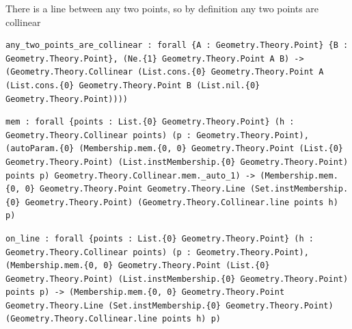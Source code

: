 \begin{theorem}
  \label{Geometry.Theory.Collinear.any_two_points_are_collinear}
  \leanok
  There is a line between any two points, so by definition any two points are collinear 
\begin{verbatim}any_two_points_are_collinear : forall {A : Geometry.Theory.Point} {B : Geometry.Theory.Point}, (Ne.{1} Geometry.Theory.Point A B) -> (Geometry.Theory.Collinear (List.cons.{0} Geometry.Theory.Point A (List.cons.{0} Geometry.Theory.Point B (List.nil.{0} Geometry.Theory.Point))))\end{verbatim}
\end{theorem}

\begin{theorem}
  \label{Geometry.Theory.Collinear.mem}
  \leanok
\begin{verbatim}mem : forall {points : List.{0} Geometry.Theory.Point} (h : Geometry.Theory.Collinear points) (p : Geometry.Theory.Point), (autoParam.{0} (Membership.mem.{0, 0} Geometry.Theory.Point (List.{0} Geometry.Theory.Point) (List.instMembership.{0} Geometry.Theory.Point) points p) Geometry.Theory.Collinear.mem._auto_1) -> (Membership.mem.{0, 0} Geometry.Theory.Point Geometry.Theory.Line (Set.instMembership.{0} Geometry.Theory.Point) (Geometry.Theory.Collinear.line points h) p)\end{verbatim}
\end{theorem}

\begin{theorem}
  \label{Geometry.Theory.Collinear.on_line}
  \leanok
\begin{verbatim}on_line : forall {points : List.{0} Geometry.Theory.Point} (h : Geometry.Theory.Collinear points) (p : Geometry.Theory.Point), (Membership.mem.{0, 0} Geometry.Theory.Point (List.{0} Geometry.Theory.Point) (List.instMembership.{0} Geometry.Theory.Point) points p) -> (Membership.mem.{0, 0} Geometry.Theory.Point Geometry.Theory.Line (Set.instMembership.{0} Geometry.Theory.Point) (Geometry.Theory.Collinear.line points h) p)\end{verbatim}
\end{theorem}

